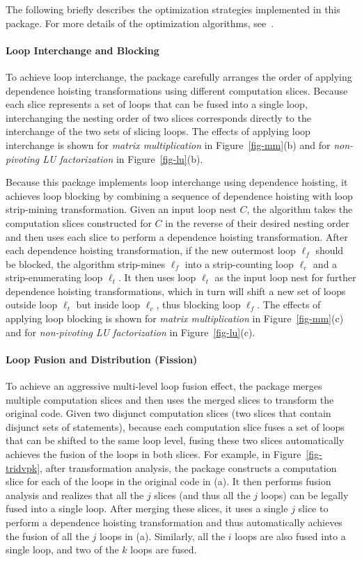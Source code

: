 The following briefly describes the optimization strategies 
implemented in this package. For more details of the optimization
algorithms, see~\cite{MyThesis}.

\paragraph {Loop Interchange and Blocking}
To achieve loop interchange,
the package carefully arranges the order of applying
dependence hoisting transformations using different computation
slices. 
Because each slice represents a set of loops that can
be fused into a single loop, interchanging the nesting order
of two slices corresponds directly to the interchange
of the two sets of slicing loops.
The effects of applying loop interchange is shown for
{\it matrix multiplication} in Figure~\ref {fig-mm}(b)
and for {\it non-pivoting LU factorization} in Figure~\ref {fig-lu}(b).

Because this package implements loop interchange
using dependence hoisting, 
it achieves loop blocking by
combining a sequence of dependence hoisting with loop
strip-mining transformation.
Given an input loop nest $C$,
the algorithm takes the computation slices constructed for $C$
in the reverse of their desired nesting order and 
then uses each slice to perform a dependence hoisting
transformation.
After each dependence hoisting
transformation, 
if the new outermost loop $\ell_f$ should be blocked,
the algorithm
strip-mines $\ell_f$ into a strip-counting 
loop $\ell_c$ and
a strip-enumerating loop $\ell_t$. It then uses loop $\ell_t$
as the input loop nest for further dependence hoisting
transformations, which in turn will shift
a new set of loops outside loop $\ell_t$ but inside loop $\ell_c$,
thus blocking loop $\ell_f$. 
The effects of applying loop blocking is shown for
{\it matrix multiplication} in Figure~\ref {fig-mm}(c)
and for {\it non-pivoting LU factorization} in Figure~\ref {fig-lu}(c).


\paragraph {Loop Fusion and Distribution (Fission)}

To achieve an aggressive multi-level
loop fusion effect, the package merges multiple computation
slices and then uses the merged slices to transform the original code.
Given two disjunct computation slices (two slices that
contain disjunct sets of statements), because each computation
slice fuses a set of loops that can be shifted to
the same loop level, fusing these two slices
automatically achieves the fusion of the loops
in both slices. For example, in Figure~\ref {fig-tridvpk},
after transformation analysis, the package constructs
a computation slice for each of the loops in the original code in (a).
It then performs fusion analysis and realizes that all the
$j$ slices (and thus all the $j$ loops) can be legally fused 
into a single loop. After merging these slices, it uses a single $j$ slice
to perform a dependence hoisting transformation and thus automatically
achieves the fusion of all the $j$ loops in (a). Similarly,
all the $i$ loops are also fused into a single loop, and two of the
$k$ loops are fused.

